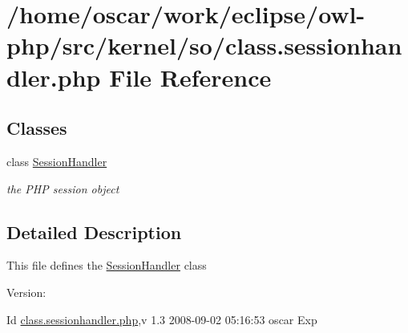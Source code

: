 \hypertarget{class_8sessionhandler_8php}{
\section{/home/oscar/work/eclipse/owl-php/src/kernel/so/class.sessionhandler.php File Reference}
\label{class_8sessionhandler_8php}
}
\subsection*{Classes}
\begin{CompactItemize}
\item 
class \hyperlink{classSessionHandler}{SessionHandler}
\begin{CompactList}\small\item\em the PHP session object \item\end{CompactList}\end{CompactItemize}


\subsection{Detailed Description}
This file defines the \hyperlink{classSessionHandler}{SessionHandler} class \begin{Desc}
\item[Version:]\end{Desc}
\begin{Desc}
\item[Id]\hyperlink{class_8sessionhandler_8php}{class.sessionhandler.php},v 1.3 2008-09-02 05:16:53 oscar Exp \end{Desc}
